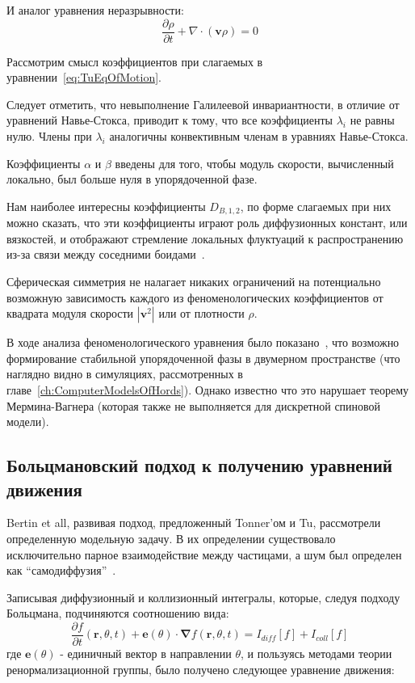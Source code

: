 		И аналог уравнения неразрывности:
		\begin{equation}
		\label{eq:TuEqOfContinuoty}
			\frac{\partial \rho}{\partial t} + \nabla \cdot (\boldsymbol{v} \rho) = 0
		\end{equation}

		Рассмотрим смысл коэффициентов при слагаемых в уравнении~\ref{eq:TuEqOfMotion}.

		Следует отметить, что невыполнение Галилеевой инвариантности, в отличие от уравнений Навье-Стокса, приводит к тому, что все коэффициенты $\lambda_i$ не равны нулю. Члены при $\lambda_i$ аналогичны конвективным членам в уравниях Навье-Стокса.

		Коэффициенты $\alpha$ и $\beta$ введены для того, чтобы модуль скорости, вычисленный локально, был больше нуля в упорядоченной фазе.

		Нам наиболее интересны коэффициенты $D_{B,1,2}$, по форме слагаемых при них можно сказать, что эти коэффициенты играют роль диффузионных констант, или вязкостей, и отображают стремление локальных флуктуаций к распространению из-за связи между соседними боидами~\cite{tu2000}.

		Сферическая симметрия не налагает никаких ограничений на потенциально возможную зависимость каждого из феноменологических коэффициентов от квадрата модуля скорости $|\boldsymbol{v}^2|$ или от плотности $\rho$.

		В ходе анализа феноменологического уравнения было показано~\cite{tu2000}, что возможно формирование стабильной упорядоченной фазы в двумерном пространстве (что наглядно видно в симуляциях, рассмотренных в главе~\ref{ch:ComputerModelsOfHords}). Однако известно что это нарушает теорему Мермина-Вагнера (которая также не выполняется для дискретной спиновой модели).

	\subsection{Больцмановский подход к получению уравнений движения} %
	\label{sub:BetrinBoltzmanApproach}
		Bertin et all, развивая подход, предложенный Tonner'ом и Tu, рассмотрели определенную модельную задачу. В их определении существовало исключительно парное взаимодействие между частицами, а шум был определен как ``самодиффузия''~\cite{bertin2006}.

		Записывая диффузионный и коллизионный интегралы, которые, следуя подходу Больцмана, подчиняются соотношению вида:
		\begin{equation}
			\frac{\partial f}{\partial t}(\boldsymbol{r},\theta,t) + \boldsymbol{e}(\theta) \cdot \boldsymbol{\nabla} f(\boldsymbol{r}, \theta, t) = I_{diff}[f]+I_{coll}[f]
		\end{equation}
		где $\boldsymbol{e}(\theta)$ - единичный вектор в направлении $\theta$, и пользуясь методами теории ренормализационной группы, было получено следующее уравнение движения:

